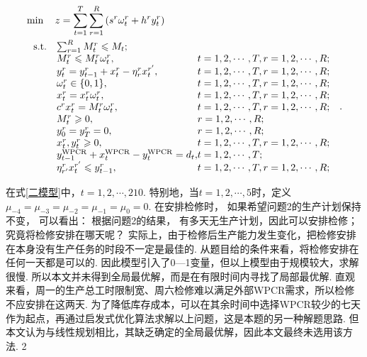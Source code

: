 \begin{equation}\label{二模型}
	\begin{aligned}
&\min \quad z  = \sum_{t  = 1}^{T} \sum_{r = 1}^{R}\left(s^{r} \omega_{t}^{r}+h^{r} y_{t}^{r}\right)\\
& \ \begin{array}{r@{\quad}l@{}l@{\quad}l}
\mathrm{s.t. } 	&\sum_{r=1}^{R} M_{t}^{r} \leqslant M_{t}; &\\
&M_{t}^{r} \leqslant M_{t}^{r} \omega_{t}^{r}, &t=1,2, \cdots, T, r=1,2, \cdots, R;\\
& y_{t}^{r}=y_{t-1}^{r}+x_{t}^{r}-\eta_{r}^{r} x_{t}^{r^{\prime}}, &t=1,2, \cdots, T,  r=1,2, \cdots, R; \\
&\omega_{t}^{r} \in\{0,1\}, &t=1,2, \cdots, T, r=1,2, \cdots, R; \\
&x_{t}^{r}=x_{t}^{r} \omega_{t}^{r},&t=1,2, \cdots, T, r=1,2, \cdots, R;\\
&c^{r} x_{t}^{r}=M_{t}^{r} \omega_{t}^{r}, &t=1,2, \cdots, T, r=1,2, \cdots, R; \\
&M_{t}^{r} \geqslant 0,& r=1,2, \cdots, R ;\\
&y_{0}^{r}=y_{T}^{r}=0,& r=1,2, \cdots, R ;\\
&x_{t}^{r}, y_{t}^{r} \geqslant 0, &t=1,2, \cdots, T, r=1,2, \cdots, R;\\
&y_{t-1}^{\mathrm{WPCR}}+x_{t}^{\mathrm{WPCR}}-y_{t}^{\mathrm{WPCR}}=d_{t}, & t=1,2, \cdots, T; \\
&\eta_{r^{\prime}}^{r} x_{t}^{r^{\prime}} \leqslant y_{t-1}^{r}, &t=1,2, \cdots, T, r=1,2, \cdots, R;
\end{array}.
\end{aligned}
\end{equation}

在式\ref{二模型}中，$t = 1, 2,\cdots, 210.$ 特别地，当$t = 1, 2,\cdots, 5$时，定义$\mu_{-4}=\mu_{-3}=\mu_{-2}=\mu_{-1}=\mu_{0}=0$.
在安排检修时， 如果希望问题2的生产计划保持不变， 可以看出： 根据问题2的结果， 有多天无生产计划，因此可以安排检修；究竟将检修安排在哪天呢？
实际上，由于检修后生产能力发生变化，把检修安排在本身没有生产任务的时段不一定是最佳的. 
从题目给的条件来看，将检修安排在任何一天都是可以的. 因此模型引入了0—1变量，但以上模型由于规模较大，求解很慢. 
所以本文并未得到全局最优解，而是在有限时间内寻找了局部最优解.
直观来看，周一的生产总工时限制宽、周六检修难以满足外部WPCR需求，所以检修不应安排在这两天. 
为了降低库存成本，可以在其余时间中选择WPCR较少的七天作为起点，再通过启发式优化算法求解以上问题，这是本题的另一种解题思路.
但本文认为与线性规划相比，其缺乏确定的全局最优解，因此本文最终未选用该方法.
2
